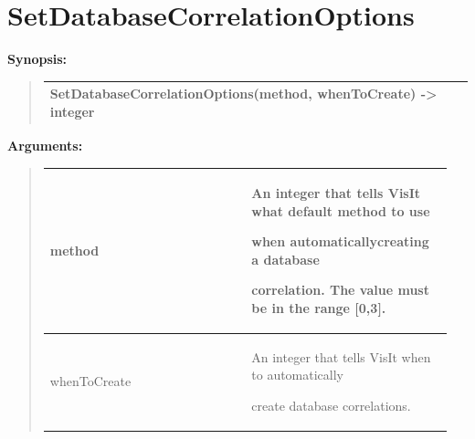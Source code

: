\documentclass[letterpaper,10pt,english]{sphinxmanual}
\begin{document}
\section{SetDatabaseCorrelationOptions}
\label{functions:setdatabasecorrelationoptions}
\begin{DUlineblock}{0em}
\item[] \textbf{Synopsis:}
\end{DUlineblock}
\begin{quote}

\begin{tabulary}{\linewidth}{|L|}
\hline

SetDatabaseCorrelationOptions(method, whenToCreate) -\textgreater{} integer
\\
\hline\end{tabulary}

\end{quote}

\begin{DUlineblock}{0em}
\item[] 
\item[] \textbf{Arguments:}
\end{DUlineblock}
\begin{quote}

\begin{tabular}{|p{0.475\linewidth}|p{0.475\linewidth}|}
\hline

method
 & 
\begin{DUlineblock}{0em}
\item[] An integer that tells VisIt what default method to use
\item[] when automaticallycreating a database
\item[] correlation. The value must be in the range {[}0,3{]}.
\end{DUlineblock}
\\
\hline
whenToCreate
 & 
\begin{DUlineblock}{0em}
\item[] An integer that tells VisIt when to automatically
\item[] create database correlations.
\end{DUlineblock}
\\
\hline\end{tabular}

\end{quote}
\end{document}
